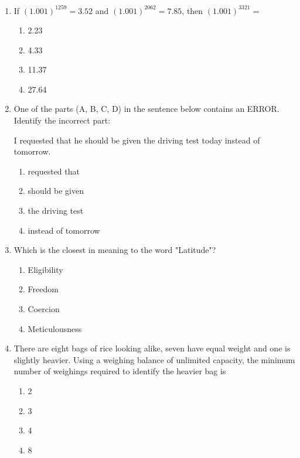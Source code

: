 \documentclass[journal]{IEEEtran}
\numberwithin{equation}{enumi}
\numberwithin{figure}{enumi}
\begin{document}
\begin{enumerate}
\item
If \((1.001)^{1259} = 3.52\) and \((1.001)^{2062} = 7.85\), then \((1.001)^{3321} =\)
\hfill{}
\begin{multicols}{4}
\begin{enumerate}
\item 2.23
\item 4.33
\item 11.37
\item 27.64
\end{enumerate}
\end{multicols}

\item
One of the parts (A, B, C, D) in the sentence below contains an ERROR. Identify the incorrect part:

I requested that he should be given the driving test today instead of tomorrow.
\hfill{}
\begin{multicols}{2}
\begin{enumerate}
\item requested that
\item should be given
\item the driving test
\item instead of tomorrow
\end{enumerate}
\end{multicols}

\item
Which is the closest in meaning to the word "Latitude"?
\hfill{}
\begin{multicols}{2}
\begin{enumerate}
\item Eligibility
\item Freedom
\item Coercion
\item Meticulousness
\end{enumerate}
\end{multicols}

\item
There are eight bags of rice looking alike, seven have equal weight and one is slightly heavier. Using a weighing balance of unlimited capacity, the minimum number of weighings required to identify the heavier bag is
\hfill{}
\begin{multicols}{4}
\begin{enumerate}
\item 2
\item 3
\item 4
\item 8
\end{enumerate}
\end{multicols}


\end{enumerate}
\end{document}
